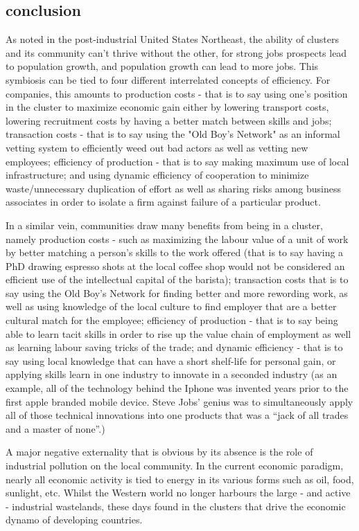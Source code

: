 \documentclass[12pt,letterpaper,notitlepage,onecolumn,final,openbib]{article}
\begin{document}
	
	\subsection{conclusion}
	
	As noted in the post-industrial United States Northeast, the ability of clusters and its community can't thrive without the other, for strong jobs prospects lead to population growth, and population growth can lead to more jobs.  This symbiosis can be tied to four different interrelated concepts of efficiency.  For companies, this amounts to production costs - that is to say using one's position in the cluster to maximize economic gain either by lowering transport costs, lowering recruitment costs by having a better match between skills and jobs; transaction costs - that is to say using the "Old Boy's Network" as an informal vetting system to efficiently weed out bad actors as well as vetting new employees; efficiency of production - that is to say making maximum use of local infrastructure; and using dynamic efficiency of cooperation to minimize waste/unnecessary duplication of effort as well as sharing risks among business associates in order to isolate a firm against failure of a particular product. 
	
	In a similar vein, communities draw many benefits from being in a cluster, namely production costs - such as maximizing the labour value of a unit of work by better matching a person's skills to the work offered (that is to say having a PhD drawing espresso shots at the local coffee shop would not be considered an efficient use of the intellectual capital of the barista); transaction costs that is to say using the Old Boy's Network for finding better and more rewording work, as well as using knowledge of the local culture to find employer that are a better cultural match for the employee; efficiency of production - that is to say being able to learn tacit skills in order to rise up the value chain of employment as well as learning labour saving tricks of the trade; and dynamic efficiency - that is to say using local knowledge that can have a short shelf-life for personal gain, or applying skills learn in one industry to innovate in a seconded industry (as an example, all of the technology behind the Iphone was invented years prior to the first apple branded mobile device.  Steve Jobs' genius was to simultaneously apply all of those technical innovations into one products that was a ``jack of all trades and a master of none''.) 
	
	A major negative externality that is obvious by its absence is the role of industrial pollution on the local community.  In the current economic paradigm, nearly all economic activity is tied to energy in its various forms such as oil, food, sunlight, etc.  Whilst the Western world no longer harbours the large - and active - industrial wastelands, these days found in the clusters that drive the economic dynamo of developing countries. 
	
\end{document}
